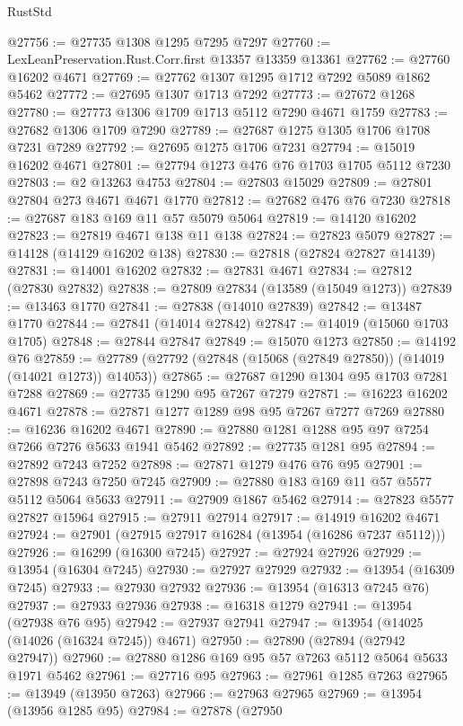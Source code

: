 \begin{lexlean}{RustStd}
\begin{coremodule}
@27756 := @27735 @1308 @1295 @7295 @7297
@27760 := LexLeanPreservation.Rust.Corr.first @13357 @13359 @13361
@27762 := @27760 @16202 @4671
@27769 := @27762 @1307 @1295 @1712 @7292 @5089 @1862 @5462
@27772 := @27695 @1307 @1713 @7292
@27773 := @27672 @1268
@27780 := @27773 @1306 @1709 @1713 @5112 @7290 @4671 @1759
@27783 := @27682 @1306 @1709 @7290
@27789 := @27687 @1275 @1305 @1706 @1708 @7231 @7289
@27792 := @27695 @1275 @1706 @7231
@27794 := @15019 @16202 @4671
@27801 := @27794 @1273 @476 @76 @1703 @1705 @5112 @7230
@27803 := @2 @13263 @4753
@27804 := @27803 @15029
@27809 := @27801 @27804 @273 @4671 @4671 @1770
@27812 := @27682 @476 @76 @7230
@27818 := @27687 @183 @169 @11 @57 @5079 @5064
@27819 := @14120 @16202
@27823 := @27819 @4671 @138 @11 @138
@27824 := @27823 @5079
@27827 := @14128 (@14129 @16202 @138)
@27830 := @27818 (@27824 @27827 @14139)
@27831 := @14001 @16202
@27832 := @27831 @4671
@27834 := @27812 (@27830 @27832)
@27838 := @27809 @27834 (@13589 (@15049 @1273))
@27839 := @13463 @1770
@27841 := @27838 (@14010 @27839)
@27842 := @13487 @1770
@27844 := @27841 (@14014 @27842)
@27847 := @14019 (@15060 @1703 @1705)
@27848 := @27844 @27847
@27849 := @15070 @1273
@27850 := @14192 @76
@27859 := @27789 (@27792 (@27848 (@15068 (@27849 @27850)) (@14019 (@14021 @1273)) @14053))
@27865 := @27687 @1290 @1304 @95 @1703 @7281 @7288
@27869 := @27735 @1290 @95 @7267 @7279
@27871 := @16223 @16202 @4671
@27878 := @27871 @1277 @1289 @98 @95 @7267 @7277 @7269
@27880 := @16236 @16202 @4671
@27890 := @27880 @1281 @1288 @95 @97 @7254 @7266 @7276 @5633 @1941 @5462
@27892 := @27735 @1281 @95
@27894 := @27892 @7243 @7252
@27898 := @27871 @1279 @476 @76 @95
@27901 := @27898 @7243 @7250 @7245
@27909 := @27880 @183 @169 @11 @57 @5577 @5112 @5064 @5633
@27911 := @27909 @1867 @5462
@27914 := @27823 @5577 @27827 @15964
@27915 := @27911 @27914
@27917 := @14919 @16202 @4671
@27924 := @27901 (@27915 @27917 @16284 (@13954 (@16286 @7237 @5112)))
@27926 := @16299 (@16300 @7245)
@27927 := @27924 @27926
@27929 := @13954 (@16304 @7245)
@27930 := @27927 @27929
@27932 := @13954 (@16309 @7245)
@27933 := @27930 @27932
@27936 := @13954 (@16313 @7245 @76)
@27937 := @27933 @27936
@27938 := @16318 @1279
@27941 := @13954 (@27938 @76 @95)
@27942 := @27937 @27941
@27947 := @13954 (@14025 (@14026 (@16324 @7245)) @4671)
@27950 := @27890 (@27894 (@27942 @27947))
@27960 := @27880 @1286 @169 @95 @57 @7263 @5112 @5064 @5633 @1971 @5462
@27961 := @27716 @95
@27963 := @27961 @1285 @7263
@27965 := @13949 (@13950 @7263)
@27966 := @27963 @27965
@27969 := @13954 (@13956 @1285 @95)
@27984 := @27878
    (@27950

\end{coremodule}
\end{lexlean}
